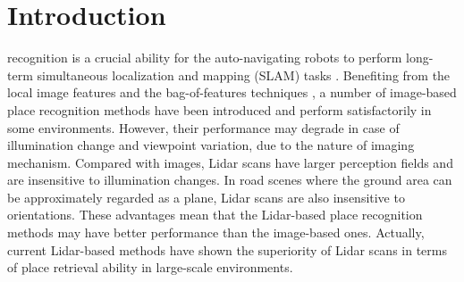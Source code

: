 \documentclass[letterpaper, 10 pt, journal, twoside]{IEEEtran}
\begin{document}
\section{Introduction}
 recognition is a crucial ability for the auto-navigating robots to perform long-term {simultaneous} localization and mapping (SLAM) tasks \cite{cadena2016past}. Benefiting from the local image features \cite{2004Distinctive,rublee2011orb} and the bag-of-features techniques \cite{nister2006scalable,arandjelovic2016netvlad}, a number of image-based place recognition methods \cite{2012Bags,2017ORB} have been introduced and perform satisfactorily in some environments. However, their performance may degrade in case of illumination change and viewpoint variation, due to the nature of imaging mechanism. Compared with images, Lidar scans have larger perception fields and are insensitive to illumination changes. In road scenes where the ground area can be approximately regarded as a plane, Lidar scans are also insensitive to orientations. These advantages mean that the Lidar-based place recognition methods may have better performance than the image-based ones. Actually, current Lidar-based methods \cite{angelina2018pointnetvlad,liu2019lpd,zhang2019pcan,du2020dh3d} have shown the superiority of  Lidar scans in terms of place retrieval ability in large-scale environments. %
\end{document}
